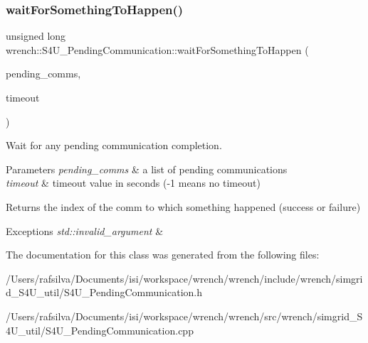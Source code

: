 \subsubsection{\texorpdfstring{wait\+For\+Something\+To\+Happen()}{waitForSomethingToHappen()}\hspace{0.1cm}{\footnotesize\ttfamily [2/2]}}
{\footnotesize\ttfamily unsigned long wrench\+::\+S4\+U\+\_\+\+Pending\+Communication\+::wait\+For\+Something\+To\+Happen (\begin{DoxyParamCaption}\item[{std\+::vector$<$ \hyperlink{classwrench_1_1_s4_u___pending_communication}{S4\+U\+\_\+\+Pending\+Communication} $\ast$$>$}]{pending\+\_\+comms,  }\item[{double}]{timeout }\end{DoxyParamCaption})\hspace{0.3cm}{\ttfamily [static]}}



Wait for any pending communication completion. 


\begin{DoxyParams}{Parameters}
{\em pending\+\_\+comms} & a list of pending communications \\
\hline
{\em timeout} & timeout value in seconds (-\/1 means no timeout)\\
\hline
\end{DoxyParams}
\begin{DoxyReturn}{Returns}
the index of the comm to which something happened (success or failure)
\end{DoxyReturn}

\begin{DoxyExceptions}{Exceptions}
{\em std\+::invalid\+\_\+argument} & \\
\hline
\end{DoxyExceptions}


The documentation for this class was generated from the following files\+:\begin{DoxyCompactItemize}
\item 
/\+Users/rafsilva/\+Documents/isi/workspace/wrench/wrench/include/wrench/simgrid\+\_\+\+S4\+U\+\_\+util/S4\+U\+\_\+\+Pending\+Communication.\+h\item 
/\+Users/rafsilva/\+Documents/isi/workspace/wrench/wrench/src/wrench/simgrid\+\_\+\+S4\+U\+\_\+util/S4\+U\+\_\+\+Pending\+Communication.\+cpp\end{DoxyCompactItemize}
